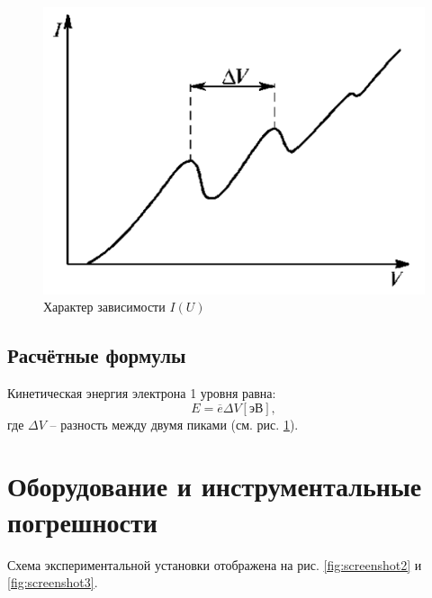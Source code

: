 \documentclass[a4paper]{article}
\begin{document}
\begin{figure}[tbh]
	\centering
	\includegraphics[width=0.4\textheight]{Screenshot_1}
	\caption{Характер зависимости $I (U)$}
	\label{fig:screenshot1}
\end{figure}

\subsection{Расчётные формулы}

Кинетическая энергия электрона 1 уровня равна:
\begin{equation}\label{key}
	E = \overline{e} \Delta V \left[эВ\right],
\end{equation}
где $ \Delta V $ -- разность между двумя пиками (см. рис. \ref{fig:screenshot1}).

\section{Оборудование и инструментальные погрешности}

Схема экспериментальной установки отображена на рис. \ref{fig:screenshot2} и \ref{fig:screenshot3}.
\end{document}
